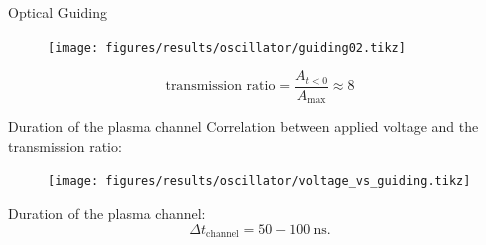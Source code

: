\documentclass[dvipsnames]{beamer}
\begin{document}
\begin{frame}{Optical Guiding}
\begin{figure}
  \texttt{[image: figures/results/oscillator/guiding02.tikz]}
\end{figure}
\begin{equation*}
\text{transmission ratio} = \frac{A_{t<0}}{A_\text{max}} \approx 8
\end{equation*}
\end{frame}
\begin{frame}{Duration of the plasma channel}
Correlation between applied voltage and the transmission ratio:
\begin{figure}
\texttt{[image: figures/results/oscillator/voltage\_vs\_guiding.tikz]}
\end{figure}
Duration of the plasma channel:
 \begin{equation*}
  \Delta t_\text{channel}=50 -100\ \si{\ns}.
 \end{equation*}
\end{frame}
\end{document}
